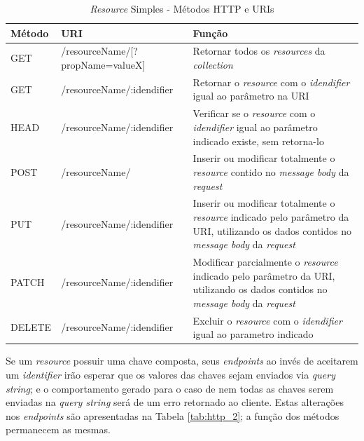 \begin{table}[]
    \centering
    \begin{tabularx}{\textwidth}{|l|l|X|}
        \hline
        \textbf{Método} & \textbf{URI} & \textbf{Função} \\
        \hline

        GET & /resourceName/[?propName=valueX]            & Retornar todos os \textit{resources} da \textit{collection}\\
        \hline

        GET & /resourceName/:idendifier & Retornar o \textit{resource} com o \textit{idendifier} igual ao parâmetro na URI\\
        \hline

        HEAD & /resourceName/:idendifier & Verificar se o \textit{resource} com o \textit{idendifier} igual ao parâmetro indicado existe, sem retorna-lo\\
        \hline

        POST & /resourceName/ & Inserir ou modificar totalmente o \textit{resource} contido no \textit{message body} da \textit{request}\\
        \hline

        PUT & /resourceName/:idendifier & Inserir ou modificar totalmente o \textit{resource} indicado pelo parâmetro da URI, utilizando os dados contidos no \textit{message body} da \textit{request}\\
        \hline

        PATCH & /resourceName/:idendifier & Modificar parcialmente o \textit{resource} indicado pelo parâmetro da URI, utilizando os dados contidos no \textit{message body} da \textit{request}\\
        \hline

        DELETE & /resourceName/:idendifier & Excluir o \textit{resource} com o \textit{idendifier} igual ao parametro indicado\\
        \hline
    \end{tabularx}
    \caption{\textit{Resource} Simples - Métodos HTTP e URIs}
    \label{tab:http_1}
\end{table}

Se um \textit{resource} possuir uma chave composta, seus \textit{endpoints} ao invés de aceitarem um \textit{identifier} irão esperar que os valores das chaves sejam enviados via \textit{query string}; e o comportamento gerado para o caso de nem todas as chaves serem enviadas na \textit{query string} será de um erro retornado ao cliente. Estas alterações nos \textit{endpoints} são apresentadas na Tabela \ref{tab:http_2}; a função dos métodos permanecem as mesmas.

